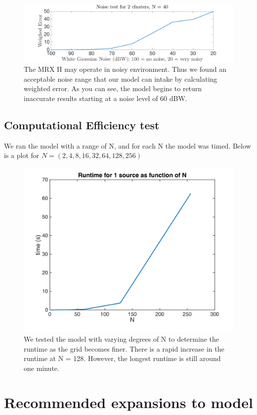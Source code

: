 \documentclass[a4paper]{article}
\begin{document}
\begin{figure}[H]
\centering
\includegraphics[width=1\textwidth]{noise_test}
\caption{The MRX II may operate in noisy environment. Thus we found an acceptable noise range that our model can intake by calculating weighted error. As you can see, the model begins to return inaccurate results starting at a noise level of 60 dBW.}
\label{Figure 8}
\end{figure}

\subsection{Computational Efficiency test}

We ran the model with a range of N, and for each N the model was timed. Below is a plot for $N = (2, 4, 8, 16, 32, 64, 128, 256)$

\begin{figure}[H]
\centering
\includegraphics[width=.7\textwidth]{runtime_efficiency.png}
\caption{We tested the model with varying degrees of N to determine the runtime as the grid becomes finer. There is a rapid increase in the runtime at N = 128. However, the longest runtime is still around one minute.}
\label{Figure 9}
\end{figure} 

\section{Recommended expansions to model}
\end{document}
